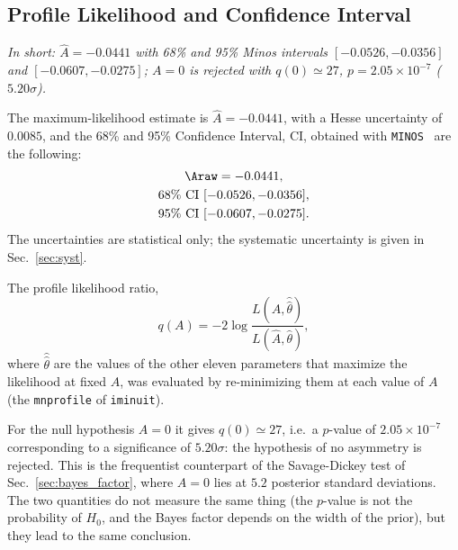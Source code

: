 \subsection{Profile Likelihood and Confidence Interval}
\label{sec:freq_ci}
\emph{In short: $\hat A=-0.0441$ with 68\% and 95\% Minos intervals $[-0.0526,-0.0356]$ and $[-0.0607,-0.0275]$; $A=0$ is rejected with $q(0)\simeq27$, $p=2.05\times10^{-7}$ ($5.20\sigma$).}


The maximum-likelihood estimate is $\hat A=-0.0441$, with a Hesse uncertainty of $0.0085$, and the 68\% and 95\% Confidence Interval, CI, obtained with \texttt{MINOS}~\cite{minuit} are the following:
\begin{gather*}
\Araw = -0.0441, \\
68\%~\text{CI}~[-0.0526, -0.0356], \\ 95\%~\text{CI}~[-0.0607, -0.0275].
\end{gather*}
The uncertainties are statistical only; the systematic uncertainty is given in Sec.~\ref{sec:syst}.

The profile likelihood ratio,
\[
q(A) = -2\log\frac{L(A,\hat{\hat\theta})}{L(\hat A,\hat\theta)},
\]
where $\hat{\hat\theta}$ are the values of the other eleven parameters that maximize the likelihood at fixed $A$, was evaluated by re-minimizing them at each value of $A$ (the \texttt{mnprofile} of \texttt{iminuit}).


For the null hypothesis $A=0$ it gives $q(0)\simeq27$, i.e.\ a $p$-value of $2.05\times10^{-7}$ corresponding to a significance of $5.20\sigma$: the hypothesis of no asymmetry is rejected. This is the frequentist counterpart of the Savage-Dickey test of Sec.~\ref{sec:bayes_factor}, where $A=0$ lies at $5.2$ posterior standard deviations.%
The two quantities do not measure the same thing (the $p$-value is not the probability of $H_0$, and the Bayes factor depends on the width of the prior), but they lead to the same conclusion.

